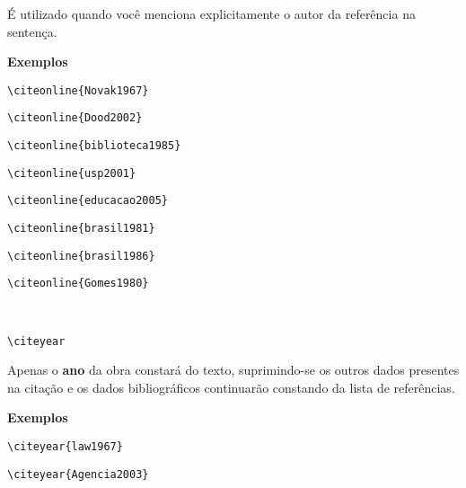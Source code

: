 \begin{alineas}
\'E utilizado quando voc\^e menciona explicitamente o autor da refer\^encia na senten\c{c}a.

\textbf{Exemplos}

\begin{verbatim}
\citeonline{Novak1967}
\end{verbatim}

\begin{verbatim}
\citeonline{Dood2002}
\end{verbatim}

\begin{verbatim}
\citeonline{biblioteca1985}
\end{verbatim}

\begin{verbatim}
\citeonline{usp2001}
\end{verbatim}

\begin{verbatim}
\citeonline{educacao2005}
\end{verbatim}

\begin{verbatim}
\citeonline{brasil1981}
\end{verbatim}

\begin{verbatim}
\citeonline{brasil1986}
\end{verbatim}

\begin{verbatim}
\citeonline{Gomes1980}
\end{verbatim}
\\

\item
\begin{verbatim}
\citeyear
\end{verbatim}

Apenas o \textbf{ano} da obra constar\'a do texto, suprimindo-se os outros dados presentes na cita\c{c}\~ao e os dados bibliogr\'aficos continuar\~ao constando da lista de refer\^encias. 

\textbf{Exemplos}

\begin{verbatim}
\citeyear{law1967}
\end{verbatim}
\citeyear{law1967}

\begin{verbatim}
\citeyear{Agencia2003}
\end{verbatim}
\citeyear{Agencia2003}


\end{alineas}
